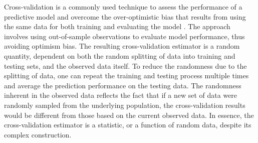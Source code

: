 \documentclass[12pt]{article}
\begin{document}
Cross-validation is a commonly used technique to assess the performance of a predictive model and overcome the over-optimistic bias that results from using the same data for both training and evaluating the model \cite{efron1997improvements, hastie2009elements, tibshirani2009bias, patil2021uniform}. The approach involves using out-of-sample observations to evaluate model performance, thus avoiding optimism bias. The resulting cross-validation estimator is a random quantity, dependent on both the random splitting of data into training and testing sets, and the observed data itself. To reduce the randomness due to the splitting of data, one can repeat the training and testing process multiple times and average the prediction performance on the testing data. The randomness inherent in the observed data reflects the fact that if a new set of data were randomly sampled from the underlying population, the cross-validation results would be different from those based on the current observed data. In essence, the cross-validation estimator is a statistic, or a function of random data, despite its complex construction.
\end{document}

